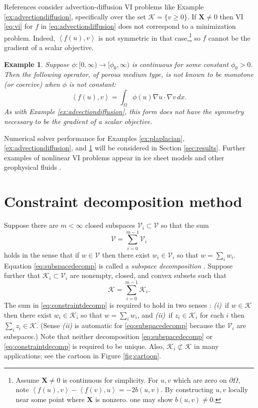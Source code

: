 \documentclass[letterpaper,final,12pt,reqno]{amsart}
\theoremstyle{cstyle}
\theoremstyle{cstyle*}
\theoremstyle{dstyle}
\newtheorem{example}[theorem]{Example}
\numberwithin{equation}{section}
\numberwithin{figure}{section}
\numberwithin{table}{section}
\numberwithin{theorem}{section}
\newcommand{\grad}{\nabla}
\newcommand{\bX}{\mathbf{X}}
\newcommand{\cK}{\mathcal{K}}
\newcommand{\cV}{\mathcal{V}}
\newcommand{\ip}[2]{\left<#1,#2\right>}
\begin{document}
References \cite{Bueler2021conservation,ChangNakshatrala2017} consider advection-diffusion VI problems like Example \ref{ex:advectiondiffusion}, specifically over the set $\cK = \{v\ge 0\}$.  If $\bX \ne 0$ then VI \eqref{eq:vi} for $f$ in \eqref{eq:advectiondiffusion} does not correspond to a minimization problem.  Indeed, $\ip{f(u)}{v}$ is not symmetric in that case,\footnote{Assume $\bX \ne 0$ is continuous for simplicity.  For $u,v$ which are zero on $\partial \Omega$, note $\ip{f(u)}{v} - \ip{f(v)}{u} = -2 b(u,v)$.  By constructing $u,v$ locally near some point where $\bX$ is nonzero. one may show $b(u,v)\ne 0$.} so $f$ cannot be the gradient of a scalar objective.

\begin{example}  \label{ex:porous}  Suppose $\phi:[0,\infty) \to [\phi_0,\infty)$ is continuous for some constant $\phi_0>0$.  Then the following operator, of porous medium type, is not known to be monotone (or coercive) when $\phi$ is not constant:
\begin{equation}
\ip{f(u)}{v} = \int_\Omega \phi(u) \grad u \cdot \grad v\,dx. \label{eq:porous}
\end{equation}
As with Example \ref{ex:advectiondiffusion}, this form does not have the symmetry necessary to be the gradient of a scalar objective.
\end{example}

Numerical solver performance for Examples \ref{ex:plaplacian}, \ref{ex:advectiondiffusion}, and \ref{ex:porous} will be considered in Section \ref{sec:results}.  Further examples of nonlinear VI problems appear in ice sheet models and other geophysical fluids \cite{Bueler2021conservation,Calvoetal2002,JouvetBueler2012}.


\section{Constraint decomposition method} \label{sec:cd}

Suppose there are $m<\infty$ closed subspaces $\cV_i \subset \cV$ so that the sum
\begin{equation}
\cV = \sum_{i=0}^{m-1} \cV_i \label{eq:subspacedecomp}
\end{equation}
holds in the sense that if $w \in \cV$ then there exist $w_i \in \cV_i$ so that $w = \sum_i w_i$.  Equation \eqref{eq:subspacedecomp} is called a \emph{subspace decomposition} \cite{Xu1992}.  Suppose further that $\cK_i \subset \cV_i$ are nonempty, closed, and convex subsets such that
\begin{equation}
\cK = \sum_{i=0}^{m-1} \cK_i. \label{eq:constraintdecomp}
\end{equation}
The sum in \eqref{eq:constraintdecomp} is required to hold in two senses \cite{TaiTseng2002}: \emph{(i)}~if $w \in \cK$ then there exist $w_i \in \cK_i$ so that $w = \sum_i w_i$, and \emph{(ii)}~if $z_i \in \cK_i$ for each $i$ then $\sum_i z_i \in \cK$.  (Sense \emph{(ii)} is automatic for \eqref{eq:subspacedecomp} because the $\cV_i$ are subspaces.)  Note that neither decomposition \eqref{eq:subspacedecomp} or \eqref{eq:constraintdecomp} is required to be unique.  Also, $\cK_i \not\subset \cK$ in many applications; see the cartoon in Figure \ref{fig:cartoon}.
\end{document}
